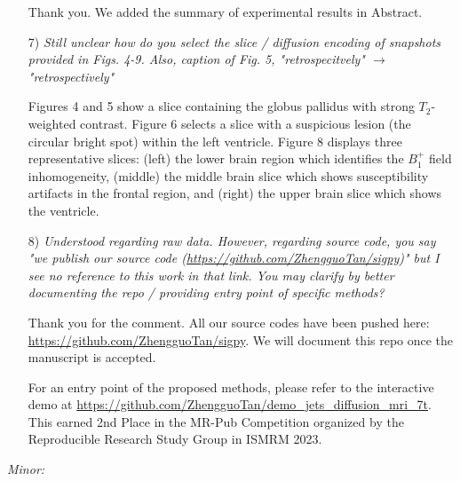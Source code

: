 \documentclass[a4paper,11pt,twoside]{report}
\begin{document}
\begin{enumerate}
    \hspace{1em} {\color{blue} Thank you.
    We added the summary of experimental results in Abstract.}

    \item [7)] \textit{Still unclear how do you select the slice / diffusion encoding of snapshots provided in Figs. 4-9. Also, caption of Fig. 5, "retrospecitvely" $\rightarrow$ "retrospectively"}

    \hspace{1em} {\color{blue}
    Figures 4 and 5 show a slice containing the globus pallidus
    with strong $T_2$-weighted contrast.
    Figure 6 selects a slice with a suspicious lesion
    (the circular bright spot)
    within the left ventricle.
    Figure 8 displays three representative slices:
    (left) the lower brain region
    which identifies the $B_1^+$ field inhomogeneity,
    (middle) the middle brain slice
    which shows susceptibility artifacts in the frontal region,
    and (right) the upper brain slice
    which shows the ventricle.}

    \item [8)] \textit{Understood regarding raw data. However, regarding source code, you say "we publish our source code (\url{https://github.com/ZhengguoTan/sigpy})" but I see no reference to this work in that link. You may clarify by better documenting the repo / providing entry point of specific methods?}

    \hspace{1em} {\color{blue} Thank you for the comment.
    All our source codes have been pushed here:
    \url{https://github.com/ZhengguoTan/sigpy}.
    We will document this repo once the manuscript is accepted.

    \hspace{1em} For an entry point of the proposed methods,
    please refer to the interactive demo at
    \url{https://github.com/ZhengguoTan/demo_jets_diffusion_mri_7t}.
    This earned 2nd Place in the MR-Pub Competition
    organized by the Reproducible Research Study Group in ISMRM 2023.}

\end{enumerate}


\noindent \textit{Minor:}
\end{document}
